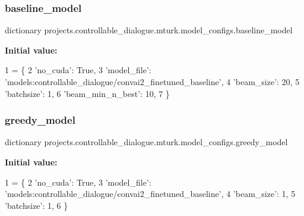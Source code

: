 \subsubsection{\texorpdfstring{baseline\+\_\+model}{baseline\_model}}
{\footnotesize\ttfamily dictionary projects.\+controllable\+\_\+dialogue.\+mturk.\+model\+\_\+configs.\+baseline\+\_\+model}

{\bfseries Initial value\+:}
\begin{DoxyCode}
1 =  \{
2     \textcolor{stringliteral}{'no\_cuda'}: \textcolor{keyword}{True},
3     \textcolor{stringliteral}{'model\_file'}: \textcolor{stringliteral}{'models:controllable\_dialogue/convai2\_finetuned\_baseline'},
4     \textcolor{stringliteral}{'beam\_size'}: 20,
5     \textcolor{stringliteral}{'batchsize'}: 1,
6     \textcolor{stringliteral}{'beam\_min\_n\_best'}: 10,
7 \}
\end{DoxyCode}
\mbox{\label{namespaceprojects_1_1controllable__dialogue_1_1mturk_1_1model__configs_afc814eb3664ad0c090f8aa371c9e0a12}} 
\subsubsection{\texorpdfstring{greedy\+\_\+model}{greedy\_model}}
{\footnotesize\ttfamily dictionary projects.\+controllable\+\_\+dialogue.\+mturk.\+model\+\_\+configs.\+greedy\+\_\+model}

{\bfseries Initial value\+:}
\begin{DoxyCode}
1 =  \{
2     \textcolor{stringliteral}{'no\_cuda'}: \textcolor{keyword}{True},
3     \textcolor{stringliteral}{'model\_file'}: \textcolor{stringliteral}{'models:controllable\_dialogue/convai2\_finetuned\_baseline'},
4     \textcolor{stringliteral}{'beam\_size'}: 1,
5     \textcolor{stringliteral}{'batchsize'}: 1,
6 \}
\end{DoxyCode}
\mbox{\label{namespaceprojects_1_1controllable__dialogue_1_1mturk_1_1model__configs_af8d4e48dab3aaa559c5ae898df841a07}} 
